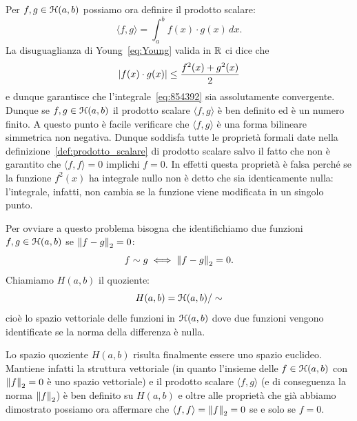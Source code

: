 Per $f,g\in \mathcal H(a,b)$ possiamo ora definire il prodotto scalare:
\begin{equation}\label{eq:854392}
  \langle f, g\rangle = \int_a^b f(x) \cdot g(x)\, dx.
\end{equation}
La disuguaglianza di
Young~\eqref{eq:Young} valida in ${\mathbb R}$ ci dice che
\[
  {\left|f(x) \cdot g(x)\right|} \le \frac{f^2(x)+g^2(x)}{2}
\]
e dunque garantisce che l'integrale~\eqref{eq:854392}
sia assolutamente convergente. Dunque se $f,g\in \mathcal H(a,b)$
il prodotto scalare $\langle f,g\rangle$ è ben definito ed
è un numero finito. A questo punto è facile verificare
che $\langle f,g\rangle$ è una forma bilineare simmetrica
non negativa. Dunque soddisfa tutte le proprietà formali
date nella definizione~\ref{def:prodotto_scalare} di prodotto scalare
salvo il fatto che non è garantito che $\langle f,f\rangle = 0$
implichi $f=0$. In effetti questa proprietà è falsa perché
se la funzione $f^2(x)$ ha integrale nullo non è detto che sia
identicamente nulla: l'integrale, infatti, non cambia
se la funzione viene modificata in un singolo punto.

Per ovviare a questo problema bisogna che identifichiamo due
funzioni $f,g\in \mathcal H(a,b)$ se ${\left\Vert f-g\right\Vert}_2=0$:
\[
  f \sim g  \iff {\left\Vert f-g\right\Vert}_2=0.
\]
Chiamiamo $H(a,b)$ il quoziente:
\[
  H(a,b) = \mathcal H(a,b)/\sim
\]
cioè lo spazio vettoriale delle funzioni in $\mathcal H(a,b)$ dove due funzioni
vengono identificate se la norma della differenza è nulla.

Lo spazio quoziente $H(a,b)$ risulta finalmente essere uno spazio
euclideo.
Mantiene infatti la struttura vettoriale (in quanto l'insieme
delle $f\in \mathcal H(a,b)$ con ${\left\Vert f\right\Vert}_2=0$
è uno spazio vettoriale)
e il prodotto scalare $\langle f,g\rangle$ (e di conseguenza la norma ${\left\Vert f\right\Vert}_2$)
è ben definito su $H(a,b)$ e oltre alle proprietà che già abbiamo dimostrato
possiamo ora affermare che $\langle f,f\rangle = {\left\Vert f\right\Vert}_2=0$ se e solo se $f=0$.

